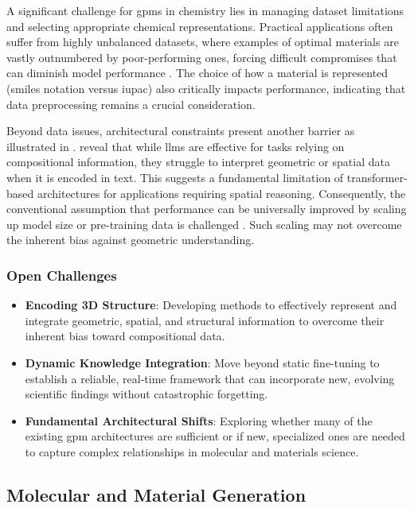 A significant challenge for \glspl{gpm} in chemistry lies in managing dataset limitations and selecting appropriate chemical representations. Practical applications often suffer from highly unbalanced datasets, where examples of optimal materials are vastly outnumbered by poor-performing ones, forcing difficult compromises that can diminish model performance \autocite{vanherck2025assessment}. The choice of how a material is represented (\gls{smiles} notation versus \gls{iupac}) also critically impacts performance, indicating that data preprocessing remains a crucial consideration.

Beyond data issues, architectural constraints present another barrier as illustrated in . \textcite{alampara2024mattext} reveal that while \glspl{llm} are effective for tasks relying on compositional information, they struggle to interpret geometric or spatial data when it is encoded in text. This suggests a fundamental limitation of transformer-based architectures for applications requiring spatial reasoning. Consequently, the conventional assumption that performance can be universally improved by scaling up model size or pre-training data is challenged \autocite{frey2023neural}. Such scaling may not overcome the inherent bias against geometric understanding.

\subsubsection{Open Challenges}
\begin{itemize}
    \item \textbf{Encoding 3D Structure}: Developing methods to effectively represent and integrate geometric, spatial, and structural information to overcome their inherent bias toward compositional data.
    \item \textbf{Dynamic Knowledge Integration}: Move beyond static fine-tuning to establish a reliable, real-time framework that can incorporate new, evolving scientific findings without catastrophic forgetting.
    \item \textbf{Fundamental Architectural Shifts}: Exploring whether many of the existing \gls{gpm} architectures are sufficient or if new, specialized ones are needed to capture complex relationships in molecular and materials science.
\end{itemize}


\subsection{Molecular and Material Generation} \label{sec:mol_generation}

